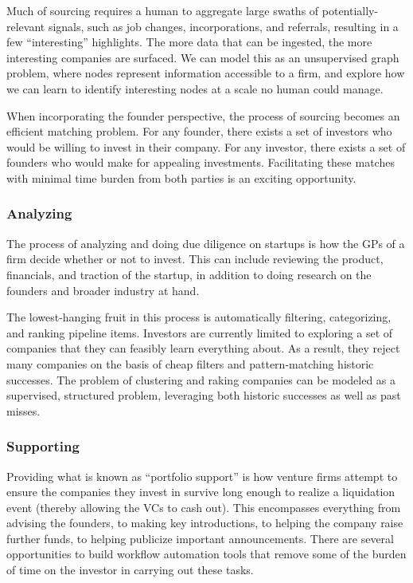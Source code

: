 Much of sourcing requires a human to aggregate large swaths of potentially-relevant signals, such as job changes, incorporations, and referrals, resulting in a few ``interesting'' highlights. The more data that can be ingested, the more interesting companies are surfaced. We can model this as an unsupervised graph problem, where nodes represent information accessible to a firm, and explore how we can learn to identify interesting nodes at a scale no human could manage.

When incorporating the founder perspective, the process of sourcing becomes an efficient matching problem. For any founder, there exists a set of investors who would be willing to invest in their company. For any investor, there exists a set of founders who would make for appealing investments. Facilitating these matches with minimal time burden from both parties is an exciting opportunity.

\subsubsection{Analyzing}

The process of analyzing and doing due diligence on startups is how the GPs of a firm decide whether or not to invest. This can include reviewing the product, financials, and traction of the startup, in addition to doing research on the founders and broader industry at hand.

The lowest-hanging fruit in this process is automatically filtering, categorizing, and ranking pipeline items. Investors are currently limited to exploring a set of companies that they can feasibly learn everything about. As a result, they reject many companies on the basis of cheap filters and pattern-matching historic successes. The problem of clustering and raking companies can be modeled as a supervised, structured problem, leveraging both historic successes as well as past misses.

\subsubsection{Supporting}

Providing what is known as ``portfolio support'' is how venture firms attempt to ensure the companies they invest in survive long enough to realize a liquidation event (thereby allowing the VCs to cash out). This encompasses everything from advising the founders, to making key introductions, to helping the company raise further funds, to helping publicize important announcements. There are several opportunities to build workflow automation tools that remove some of the burden of time on the investor in carrying out these tasks.

